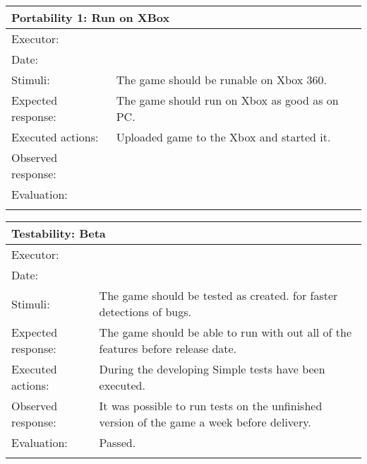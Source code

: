 \begin{tabular}{|p{3.5cm}|p{7.5cm}|}
\hline
\multicolumn{2}{|l|}{Portability 1: Run on XBox}\\
\hline
Executor: 					& \\   
Date:    						& \\ 			
Stimuli:     				& The game should be runable on Xbox 360.\\
Expected response:  & The game should run on Xbox as good as on PC.\\
Executed actions:   & Uploaded  game to the Xbox and started it.\\
Observed response:  & \\ 
Evaluation:    			& \\ 
\hline
\multicolumn{2}{l}{ }\\
\end{tabular}


\begin{tabular}{|p{3.5cm}|p{7.5cm}|}
\hline
\multicolumn{2}{|l|}{Testability: Beta}\\
\hline
Executor: 					& \\   
Date:    						& \\ 			
Stimuli:     				& The game should be tested as created. for faster detections of bugs.\\
Expected response:  & The game should be able to run with out all of the features before release date.\\
Executed actions:   & During the developing Simple tests have been executed.\\
Observed response:  & It was possible to run  tests on the unfinished version of the game a week before delivery.\\ 
Evaluation:    			& Passed.\\ 
\hline
\multicolumn{2}{l}{ }\\
\end{tabular}